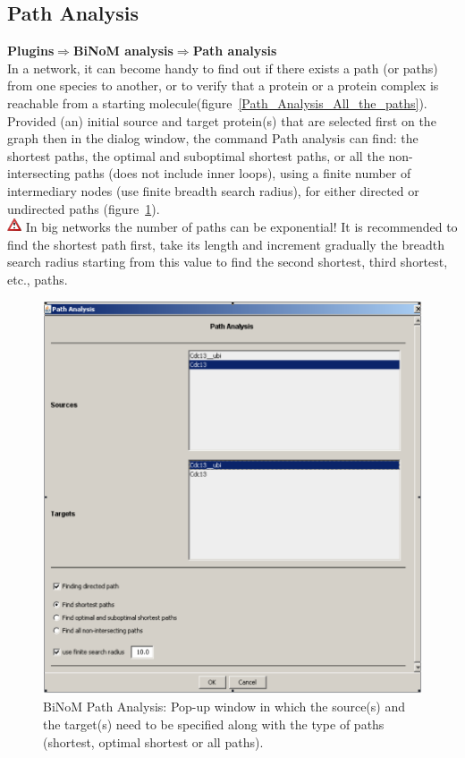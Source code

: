 \subsection{Path Analysis}
\textbf{Plugins$\Rightarrow$BiNoM analysis$\Rightarrow$Path analysis}\\
In a network, it can become handy to find out if there exists a path (or paths) from one species to another, or to verify that a protein or a protein complex is reachable from a starting molecule(figure~\ref{Path_Analysis_All_the_paths}). Provided (an) initial source and target protein(s) that are selected first on the graph then in the dialog window, the command Path analysis can find: the shortest paths, the optimal and suboptimal shortest paths, or all the non-intersecting paths (does not include inner loops), using a finite number of intermediary nodes (use finite breadth search radius), for either directed or undirected paths (figure~\ref{Path_Analysis_Pop-up_window}).\\
\includegraphics[width=12pt,height=12pt]{graphics/warning} In big networks the number of paths can be exponential! It is recommended to find the shortest path first, take its length and increment gradually the breadth search radius starting from this value to find the second shortest, third shortest, etc., paths.\\
\begin{figure}
\centering
\includegraphics[width=14 cm]{graphics/Path_Analysis_Pop-up_window}
\caption{BiNoM Path Analysis: Pop-up window in which the source(s) and the target(s) need to be specified along with the type of paths (shortest, optimal shortest or all paths).}
\label{Path_Analysis_Pop-up_window}
\end{figure}
